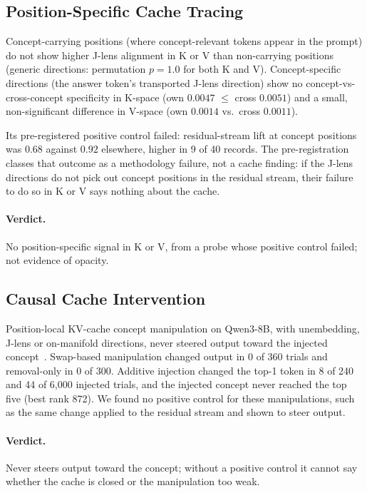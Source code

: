 \documentclass[11pt,a4paper]{article}
\begin{document}
\subsection{Position-Specific Cache Tracing}
\label{sec:position}

Concept-carrying positions (where concept-relevant tokens appear in
the prompt) do not show higher J-lens alignment in K or V than
non-carrying positions (generic directions: permutation $p{=}1.0$
for both K and V). Concept-specific directions (the answer token's
transported J-lens direction) show no concept-vs-cross-concept
specificity in K-space (own $0.0047$ $\leq$ cross $0.0051$) and a
small, non-significant difference in V-space (own $0.0014$ vs.\ cross
$0.0011$).

Its pre-registered positive control failed: residual-stream lift at concept positions was
$0.68$ against $0.92$ elsewhere, higher in 9 of 40 records. The
pre-registration classes that outcome as a methodology failure, not a cache finding: if the J-lens
directions do not pick out concept positions in the residual stream,
their failure to do so in K or V says nothing about the cache.

\paragraph{Verdict.} No position-specific signal in K or V, from a probe
whose positive control failed; not evidence of opacity.

\subsection{Causal Cache Intervention}
\label{sec:causal}

Position-local KV-cache concept manipulation on Qwen3-8B, with
unembedding, J-lens or on-manifold directions, never steered output
toward the injected concept~\citep{lyra2026cache_tracing}. Swap-based
manipulation changed output in 0 of 360 trials and removal-only in 0 of 300.
Additive injection changed the top-1 token in 8 of 240 and 44 of 6{,}000 injected trials, and the injected concept never reached the top
five (best rank 872). We found no positive control for these
manipulations, such as the same change applied to the residual stream
and shown to steer output.

\paragraph{Verdict.} Never steers output toward the concept; without a
positive control it cannot say whether the cache is closed or the
manipulation too weak.
\end{document}
